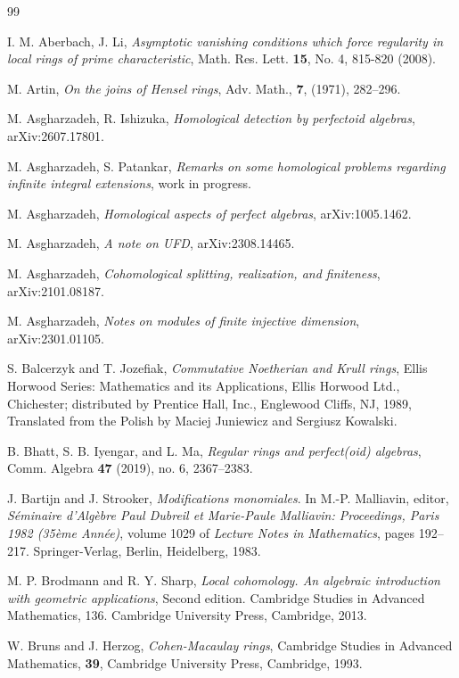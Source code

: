 \documentclass[11pt,a4paper]{amsart}
\numberwithin{equation}{section}
\theoremstyle{definition}
\theoremstyle{remark}
\begin{document}
	
\begin{thebibliography}{99}

 I. M. Aberbach, J. Li, 
\emph{Asymptotic vanishing conditions which force regularity in local rings of prime characteristic}, 
		Math. Res. Lett. {\bf 15}, No. 4, 815-820 (2008).
		
M. Artin,  \emph{On the joins of Hensel rings}, Adv. Math., {\bf7}, (1971), 282--296.
		
		
M. Asgharzadeh, R. Ishizuka, 
\emph{Homological detection by perfectoid algebras},  	arXiv:2607.17801.
		
 M. Asgharzadeh,  S. Patankar, {\it Remarks on some homological problems regarding infinite integral extensions}, work in progress.

 M. Asgharzadeh,   {\it Homological aspects of perfect algebras}, arXiv:1005.1462.

M. Asgharzadeh, {\it A note on UFD},
arXiv:2308.14465.

	 M.
 Asgharzadeh,     {\it Cohomological splitting, realization, and  finiteness}, arXiv:2101.08187.
 
	 M.
	Asgharzadeh,     {\it Notes on modules of finite injective dimension}, arXiv:2301.01105.

	S. Balcerzyk and T. Jozefiak,  {\it Commutative Noetherian and Krull rings}, Ellis Horwood Series:
	Mathematics and its Applications, Ellis Horwood Ltd., Chichester; distributed by Prentice Hall, Inc., Englewood Cliffs, NJ, 1989, Translated from the Polish by Maciej Juniewicz and Sergiusz Kowalski.
	
 B. Bhatt, S. B. Iyengar, and L. Ma, \emph{Regular rings and perfect(oid) algebras}, Comm. Algebra {\bf 47} (2019), no. 6, 2367–2383.
		
 J. Bartijn and J. Strooker, \emph{Modifications monomiales}. In M.-P. Malliavin, editor, \emph{S\'eminaire d'Alg\`ebre Paul Dubreil et Marie-Paule Malliavin: Proceedings, Paris 1982 (35\`eme Ann\'ee)}, volume 1029 of \emph{Lecture Notes in Mathematics}, pages 192--217. Springer-Verlag, Berlin, Heidelberg, 1983.
		
 M. P. Brodmann and R. Y. Sharp, \emph{Local cohomology. An algebraic introduction with geometric applications}, Second edition. Cambridge Studies in Advanced Mathematics, 136. Cambridge University Press, Cambridge, 2013.
		
 W. Bruns and J. Herzog, \emph{Cohen-Macaulay rings}, Cambridge Studies in Advanced Mathematics, {\bf 39}, Cambridge University Press, Cambridge, 1993.
		

\end{thebibliography}
\end{document}
